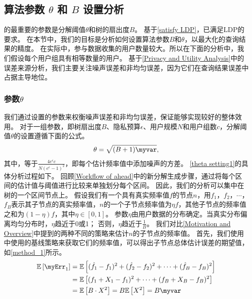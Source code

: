 \subsection{算法参数 $\theta$ 和 $B$ 设置分析}
\label{Selection parameters}
\myahead 的最重要的参数是分解阈值$\theta$和树的扇出度$B$。
基于\autoref{satisfy LDP}，\myahead 已满足LDP的要求。
在本节中，我们的目标是分析如何设置算法参数$B$和$\theta$，以最大化\myahead 的查询结果的精度。
在实际中，参与数据收集的用户数量较大。所以在下面的分析中，我们假设每个用户组具有相等数量的用户。
基于\autoref{Privacy and Utility Analysis}中的误差来源分析，我们主要关注噪声误差和非均匀误差，因为它们在查询结果误差中占据主导地位。

\subsubsection{参数$\theta$}
我们通过设置\myahead 的参数来权衡噪声误差和非均匀误差，保证\myahead 能够实现较好的整体效用。
对于一组参数，即树扇出度$B$、隐私预算$\epsilon$、用户规模$N$和用户组数$c$，分解阈值$\theta$的设置遵循下面的公式。
\begin{equation}
    \theta = \sqrt{(B+1)\myvar}, 
    \label{theta setting1}
\end{equation}    
其中，\myvar 等于$\frac{4e^{\epsilon}c}{N\left(e^{\epsilon}-1\right)^{2}}$，即每个估计频率值中添加噪声的方差。
\autoref{theta setting1}的具体分析过程如下。
回顾\autoref{Workflow of ahead}中的新分解生成步骤，\myahead 通过将每个区间的估计值与阈值进行比较来单独划分每个区间。
因此，我们的分析可以集中在\myahead 树的一个区间节点上。
假设我们有一个具有真实频率值$f$的节点$n$，用$f_1$，$f_2$，$\cdots$，$f_B$表示其子节点的真实频率值，$n$的一个子节点频率值为$\eta f$，其他子节点的频率值之和为$(1-\eta)f$，其中$\eta \in [0,1]$。
参数$\eta$由用户数据的分布确定。当真实分布偏离均匀分布时，$\eta$趋近于0或1；
否则，$\eta$趋近于$\frac{1}{B}$。
我们对比\autoref{Motivation and Overview}中提到的两种不同的策略来估计$n$的子节点的频率值。
首先，我们使用\myhio 中使用的基线策略来获取它们的频率值，可以得出子节点总体估计误差的期望值，如\autoref{method_1}所示。
\begin{align}
    \mathbb{E}\left[\myErr_1\right] & = \mathbb{E}\left[(\hat{f_1} - f_1)^2 + (\hat{f_2} - f_2)^2 + \cdots + (\hat{f}_B - f_B)^2\right]        \nonumber \\
        & = \mathbb{E}\left[(f_1 + X_1 - f_1)^2 +  \cdots + (f_B + X_B - f_B)^2\right] \nonumber \\
        & = \mathbb{E}\left[B \cdot X^2\right] = B\mathbb{E}\left[X^2\right] = B\myvar
    \label{method_1}
\end{align}    

